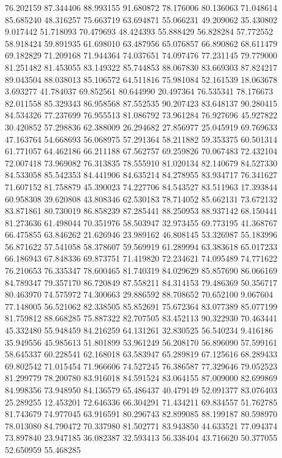 76.202159
87.344406
88.993155
91.680872
78.176006
80.136063
71.048614
85.685240
48.316257
75.663719
63.694871
55.066231
49.209062
35.430802
9.017442
51.718093
70.479693
48.424393
55.888429
56.828284
57.772552
58.918424
59.891935
61.698010
63.487956
65.076857
66.890862
68.611479
69.182829
71.209168
71.944364
74.037651
74.097476
77.231145
79.779000
81.251482
81.453055
83.149322
85.744853
88.067830
83.669303
87.824217
89.043504
88.038013
85.106572
64.511816
75.981084
52.161539
18.063678
3.693277
41.784037
69.852561
80.644990
20.497364
76.535341
78.176673
82.011558
85.329343
86.958568
87.552535
90.207423
83.648137
90.280415
84.534326
77.237699
76.955513
81.086792
73.961284
76.927696
45.927822
30.420852
57.298836
62.388009
26.294682
27.856977
25.045919
69.769633
47.163764
54.668693
56.068975
57.291364
58.211882
59.353375
60.501314
61.771057
64.462186
66.211188
67.562757
69.259826
70.067483
72.432104
72.007418
73.969082
76.313835
78.555910
81.020134
82.140679
84.527330
84.533058
85.542353
84.441906
84.635214
84.278955
83.934717
76.341627
71.607152
81.758879
45.390023
74.227706
84.543527
83.511963
17.393844
60.958308
39.620808
43.808346
62.530183
78.714052
85.662131
73.672132
83.871861
80.730019
86.858239
87.285441
88.250953
88.937142
68.150441
81.273636
61.498044
70.351976
58.503947
32.973455
69.773195
41.368767
66.475855
63.846262
21.626946
23.989162
46.808145
53.326987
55.183996
56.871622
57.541058
58.378607
59.569919
61.289994
63.383618
65.017233
66.186943
67.848336
69.873751
71.419820
72.234621
74.095489
74.771622
76.210653
76.335347
78.600465
81.740319
84.029629
85.857690
86.066169
84.789347
79.357170
86.720849
87.558211
84.314153
79.486369
50.356717
80.463970
74.575972
74.300663
29.886592
88.708652
70.652100
9.067604
77.148005
56.521062
82.338505
85.852691
75.672364
83.077389
85.077199
81.759812
88.668285
75.887322
82.707505
83.452113
90.322930
70.463441
45.332480
55.948459
84.216259
64.131261
32.830525
56.540234
9.416186
35.949556
45.985613
51.801899
53.961249
56.208170
56.896090
57.599161
58.645337
60.228541
62.168018
63.583947
65.289819
67.125616
68.289433
69.802542
71.015454
71.966606
74.527245
76.386587
77.329646
79.052523
81.299779
78.200780
83.916018
84.591524
83.064155
87.009000
82.699869
84.998356
73.948950
84.136579
65.486437
40.479149
52.091377
83.076403
25.289255
12.453201
72.646336
66.304291
71.434211
69.834557
51.762785
81.743679
74.977045
63.916591
80.296743
82.899085
88.199187
80.598970
78.013080
84.790472
70.337980
81.502771
83.943850
44.633521
77.094374
73.897840
23.947185
36.082387
32.593413
56.338404
43.716620
50.377055
52.650959
55.468285
